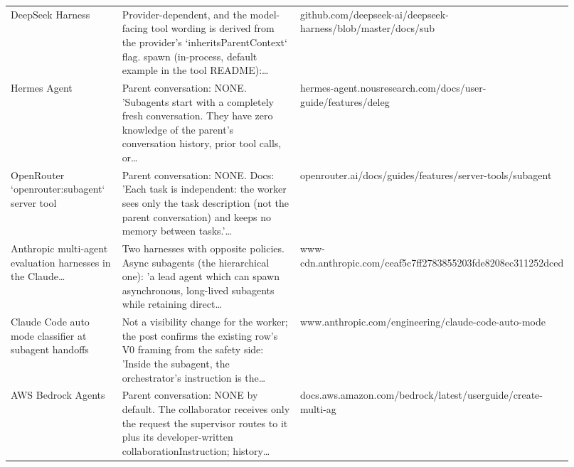 \begin{longtable}{p{0.22\linewidth}p{0.5\linewidth}p{0.2\linewidth}}
DeepSeek Harness & Provider-\allowbreak{}dependent, and the model-\allowbreak{}facing tool wording is derived from the provider's `inheritsPare\allowbreak{}ntContext` flag.\allowbreak{} spawn (in-\allowbreak{}process, default example in the tool README):\ldots & github.\allowbreak{}com/\allowbreak{}deepseek-\allowbreak{}ai/\allowbreak{}deepseek-\allowbreak{}harness/\allowbreak{}blob/\allowbreak{}master/\allowbreak{}docs/\allowbreak{}sub \\
Hermes Agent & Parent conversation: NONE.\allowbreak{} 'Subagents start with a completely fresh conversation.\allowbreak{} They have zero knowledge of the parent's conversation history, prior tool calls, or\ldots & hermes-\allowbreak{}agent.\allowbreak{}nousresearch.\allowbreak{}com/\allowbreak{}docs/\allowbreak{}user-\allowbreak{}guide/\allowbreak{}features/\allowbreak{}deleg \\
OpenRouter `openrouter:subagent` server tool & Parent conversation: NONE.\allowbreak{} Docs: 'Each task is independent: the worker sees only the task description (not the parent conversation) and keeps no memory between tasks.\allowbreak{}'\ldots & openrouter.\allowbreak{}ai/\allowbreak{}docs/\allowbreak{}guides/\allowbreak{}features/\allowbreak{}server-\allowbreak{}tools/\allowbreak{}subagent \\
Anthropic multi-\allowbreak{}agent evaluation harnesses in the Claude\ldots & Two harnesses with opposite policies.\allowbreak{} Async subagents (the hierarchical one): 'a lead agent which can spawn asynchronous, long-\allowbreak{}lived subagents while retaining direct\ldots & www-\allowbreak{}cdn.\allowbreak{}anthropic.\allowbreak{}com/\allowbreak{}ceaf5c7ff278\allowbreak{}3855203fde82\allowbreak{}08ec311252dc\allowbreak{}ed \\
Claude Code auto mode classifier at subagent handoffs & Not a visibility change for the worker; the post confirms the existing row's V0 framing from the safety side: 'Inside the subagent, the orchestrator's instruction is the\ldots & www.\allowbreak{}anthropic.\allowbreak{}com/\allowbreak{}engineering/\allowbreak{}claude-\allowbreak{}code-\allowbreak{}auto-\allowbreak{}mode \\
AWS Bedrock Agents & Parent conversation: NONE by default.\allowbreak{} The collaborator receives only the request the supervisor routes to it plus its developer-\allowbreak{}written collaboratio\allowbreak{}nInstruction; history\ldots & docs.\allowbreak{}aws.\allowbreak{}amazon.\allowbreak{}com/\allowbreak{}bedrock/\allowbreak{}latest/\allowbreak{}userguide/\allowbreak{}create-\allowbreak{}multi-\allowbreak{}ag \\

\end{longtable}
